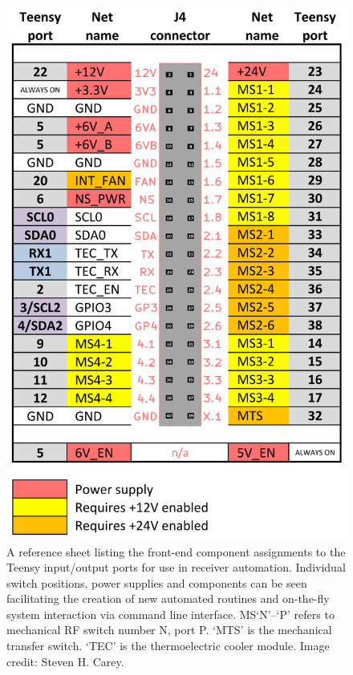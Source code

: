 \begin{figure}
    \centering
    \includegraphics{controller_pinout}
    \caption{A reference sheet listing the front-end component assignments to the Teensy input/output ports for use in receiver automation. Individual switch positions, power supplies and components can be seen facilitating the creation of new automated routines and on-the-fly system interaction via command line interface. MS‘N’--‘P’ refers to mechanical RF switch number N, port P. ‘MTS’ is the mechanical transfer switch. ‘TEC’ is the thermoelectric cooler module. Image credit: Steven H. Carey.}
    \label{fig:controller_pinout}
\end{figure}

